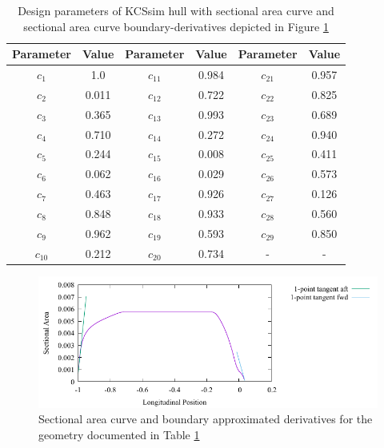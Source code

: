\documentclass{report}
\begin{document}
\begin{table}[H]
    \centering
    \begin{tabular}{|c|c|c|c|c|c|}
        \hline 
        Parameter & Value & Parameter & Value & Parameter & Value\\
        \hline 
        $c_1$ & 1.0 & $c_{11}$ & 0.984 & $c_{21}$ & 0.957 \\
        \hline 
        $c_2$ & 0.011 & $c_{12}$ & 0.722 & $c_{22}$ & 0.825\\
        \hline 
        $c_3$ & 0.365 & $c_{13}$ & 0.993 & $c_{23}$ & 0.689 \\
        \hline 
        $c_4$ & 0.710 & $c_{14}$ & 0.272 & $c_{24}$ & 0.940 \\
        \hline 
        $c_5$ & 0.244 & $c_{15}$ & 0.008 & $c_{25}$ & 0.411 \\
        \hline 
        $c_6$ & 0.062 & $c_{16}$ & 0.029 & $c_{26}$ & 0.573 \\
        \hline 
        $c_7$ & 0.463 & $c_{17}$ & 0.926 & $c_{27}$ & 0.126 \\
        \hline 
        $c_8$ & 0.848 & $c_{18}$ & 0.933 & $c_{28}$ & 0.560 \\
        \hline 
        $c_9$ & 0.962 & $c_{19}$ & 0.593 & $c_{29}$ & 0.850 \\
        \hline 
        $c_{10}$ & 0.212 & $c_{20}$ & 0.734 & - & - \\
        \hline 
    \end{tabular}
    \caption{Design parameters of KCSsim hull with sectional area curve and 
    sectional area curve boundary-derivatives depicted in Figure
    \ref{fig:test-4-sac-12}}
    \label{tab:test-4-12}
\end{table}
\begin{figure}[H]
    \centering
    \includegraphics[width = 0.7\linewidth]{figures/test-4-sac-12.pdf}
    \caption{Sectional area curve and boundary approximated derivatives for
    the geometry documented in Table \ref{tab:test-4-12}}
    \label{fig:test-4-sac-12}
\end{figure}
\end{document}
